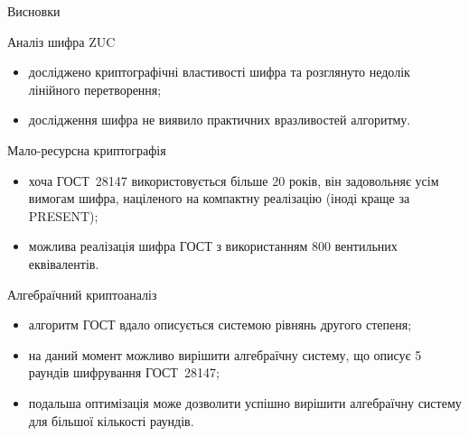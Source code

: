 \documentclass[10pt, ucs, handout]{beamer}
\begin{document}
\begin{frame}{Висновки}
    \footnotesize
    \begin{block}{Аналіз шифра ZUC}
        \begin{itemize}
            \item досліджено криптографічні властивості шифра та розглянуто
                недолік лінійного перетворення;
            \item дослідження шифра не виявило практичних вразливостей
                алгоритму.
        \end{itemize}
    \end{block}

    \begin{block}{Мало-ресурсна криптографія}
        \begin{itemize}
            \item хоча ГОСТ~28147 використовується більше 20 років, він задовольняє
                усім вимогам шифра, націленого на компактну реалізацію (іноді краще за PRESENT);
            \item можлива реалізація шифра ГОСТ з використанням 800 вентильних еквівалентів.
        \end{itemize}
    \end{block}

    \begin{block}{Алгебраїчний криптоаналіз}
        \begin{itemize}
            \item алгоритм ГОСТ вдало описується системою рівнянь другого степеня;
            \item на даний момент можливо вирішити алгебраїчну систему, що
                описує 5 раундів шифрування ГОСТ~28147;
            \item подальша оптимізація може дозволити успішно вирішити алгебраїчну систему
                для більшої кількості раундів.
        \end{itemize} 
    \end{block}
\end{frame}
\end{document}
